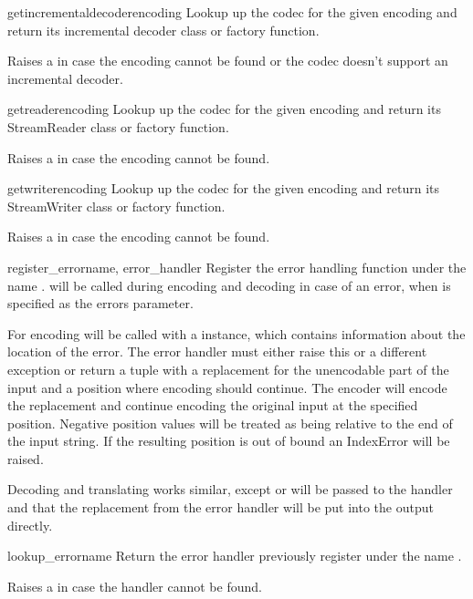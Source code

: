 \begin{funcdesc}{getincrementaldecoder}{encoding}
Lookup up the codec for the given encoding and return its incremental decoder
class or factory function.

Raises a  in case the encoding cannot be found or the
codec doesn't support an incremental decoder.
\end{funcdesc}

\begin{funcdesc}{getreader}{encoding}
Lookup up the codec for the given encoding and return its StreamReader
class or factory function.

Raises a  in case the encoding cannot be found.
\end{funcdesc}

\begin{funcdesc}{getwriter}{encoding}
Lookup up the codec for the given encoding and return its StreamWriter
class or factory function.

Raises a  in case the encoding cannot be found.
\end{funcdesc}

\begin{funcdesc}{register_error}{name, error_handler}
Register the error handling function  under the
name .  will be called during encoding
and decoding in case of an error, when  is specified as the
errors parameter.

For encoding  will be called with a
 instance, which contains information about
the location of the error. The error handler must either raise this or
a different exception or return a tuple with a replacement for the
unencodable part of the input and a position where encoding should
continue. The encoder will encode the replacement and continue encoding
the original input at the specified position. Negative position values
will be treated as being relative to the end of the input string. If the
resulting position is out of bound an IndexError will be raised.

Decoding and translating works similar, except 
or  will be passed to the handler and
that the replacement from the error handler will be put into the output
directly.
\end{funcdesc}

\begin{funcdesc}{lookup_error}{name}
Return the error handler previously register under the name .

Raises a  in case the handler cannot be found.
\end{funcdesc}

